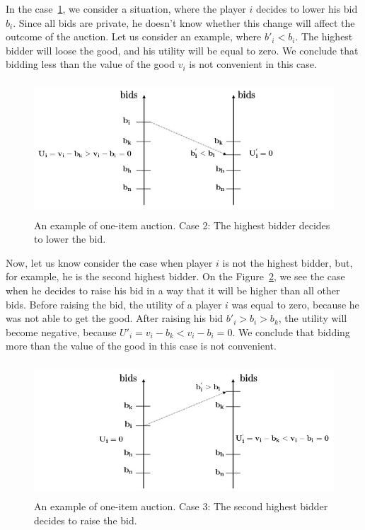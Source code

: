 \documentclass{article}
\begin{document}
In the case~\ref{fig:bids2}, we consider a situation, where the player $i$ decides to lower his bid $b_i$. Since all bids are private, he doesn't know whether this change will affect the outcome of the auction. Let us consider an example, where $b'_i<b_i$. The highest bidder will loose the good, and his utility will be equal to zero. We conclude that bidding less than the value of the good $v_i$ is not convenient in this case.
\begin{figure}
	[!hbt] 
	\begin{center}
		\includegraphics[height=5cm]{img8.jpg} \caption{An example of one-item auction. Case 2: The highest bidder decides to lower the bid.} \label{fig:bids2} 
	\end{center}
\end{figure}

Now, let us know consider the case when player $i$ is not the highest bidder, but, for example, he is the second highest bidder. On the Figure~\ref{fig:bids3}, we see the case when he decides to raise his bid in a way that it will be higher than all other bids. Before raising the bid, the utility of a player $i$ was equal to zero, because he was not able to get the good. After raising his bid $b'_i>b_i>b_k$, the utility will become negative, because $U'_i=v_i-b_k<v_i-b_i=0$. We conclude that bidding more than the value of the good in this case is not convenient.
\begin{figure}
	[!hbt] 
	\begin{center}
		\includegraphics[height=5cm]{img9.jpg} \caption{An example of one-item auction. Case 3: The second highest bidder decides to raise the bid.} \label{fig:bids3} 
	\end{center}
\end{figure}
\end{document}
